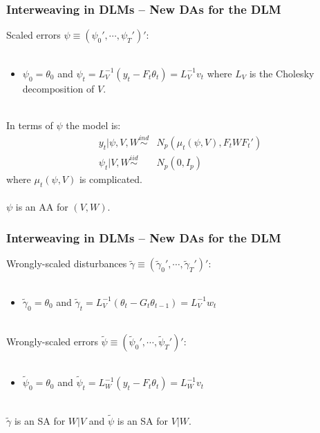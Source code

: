 \documentclass[xcolor=dvipsnames]{beamer}
\begin{document}
\begin{frame}
\frametitle{Interweaving in DLMs -- New DAs for the DLM}
Scaled errors $\psi\equiv(\psi_0',\cdots,\psi_T')'$:\\~\\
\begin{itemize}
\item[]$\psi_0=\theta_0$ and $\psi_t=L_V^{-1}(y_t - F_t\theta_t)=L_V^{-1}v_t$ where $L_V$ is the Cholesky decomposition of $V$.\\~\\
\end{itemize}
 
In terms of $\psi$ the model is:
\begin{align*}
y_t|\psi,V,W \stackrel{ind}{\sim} &N_p(\mu_t(\psi,V),F_tWF_t')\\
\psi_t|V,W \stackrel{iid}{\sim} &N_p(0,I_p)
\end{align*} 
where $\mu_t(\psi,V)$ is complicated.\\~\\

{\color{blue}$\psi$ is an AA for $(V,W)$.}
\end{frame}

\begin{frame}
\frametitle{Interweaving in DLMs -- New DAs for the DLM}
Wrongly-scaled disturbances $\tilde{\gamma}\equiv(\tilde{\gamma}_0',\cdots,\tilde{\gamma}_T')'$:\\~\\
\begin{itemize}
\item[]$\tilde{\gamma}_0=\theta_0$ and $\tilde{\gamma}_t=L_V^{-1}(\theta_t - G_t\theta_{t-1})=L_V^{-1}w_t$\\~\\
\end{itemize}

Wrongly-scaled errors $\tilde{\psi}\equiv(\tilde{\psi}_0',\cdots,\tilde{\psi}_T')'$:\\~\\
\begin{itemize}
\item[]$\tilde{\psi}_0=\theta_0$ and $\tilde{\psi}_t=L_W^{-1}(y_t - F_t\theta_{t})=L_W^{-1}v_t$\\~\\
\end{itemize}

{\color{blue} $\tilde{\gamma}$ is an SA for $W|V$ and $\tilde{\psi}$ is an SA for $V|W$.}
\end{frame}
\end{document}
